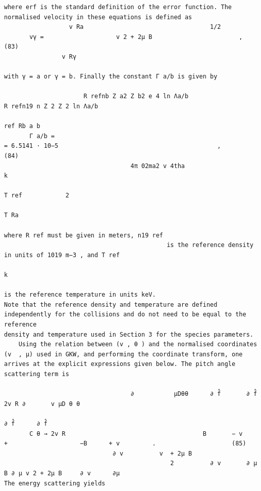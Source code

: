 \documentclass[a4paper]{article}
\newcommand{\gkwpagefont}{\fontsize{6.0pt}{7.55pt}\selectfont}
\begin{document}
\begin{Verbatim}[fontsize=\gkwpagefont]
where erf is the standard definition of the error function. The normalised velocity in these equations is defined as
                  v Ra                                   1/2
       vγ =                    v 2 + 2μ B                        ,                                                                                                    (83)
                v Rγ

with γ = a or γ = b. Finally the constant Γ a/b is given by

                      R refnb Z a2 Z b2 e 4 ln Λa/b                                                    R refn19 n Z 2 Z 2 ln Λa/b
                                                                                                             ref Rb a b
       Γ a/b =                                                              = 6.5141 · 10−5                                            ,                               (84)
                                   4π 02ma2 v 4tha                                                        k
                                                                                                        T ref            2
                                                                                                                       T Ra

where R ref must be given in meters, n19 ref
                                             is the reference density in units of 1019 m−3 , and T ref
                                                                                                   k
                                                                                                       is the reference temperature in units keV.
Note that the reference density and temperature are defined independently for the collisions and do not need to be equal to the reference
density and temperature used in Section 3 for the species parameters.
    Using the relation between (v , θ ) and the normalised coordinates (v  , μ) used in GKW, and performing the coordinate transform, one
arrives at the explicit expressions given below. The pitch angle scattering term is
                                                                                                                                        
                                   ∂           μDθθ      ∂ f̂       ∂ f̂                                  2v R ∂       v μD θ θ
                                                                                                                               ∂ f̂      ∂ f̂
       C θ → 2v R                                      B       − v                                    +                    −B      + v         .                     (85)
                              ∂ v          v  + 2μ B
                                              2          ∂ v       ∂ μ                                  B ∂ μ v 2 + 2μ B     ∂ v      ∂μ
The energy scattering yields
                                                                                                                                           

\end{Verbatim}
\end{document}
